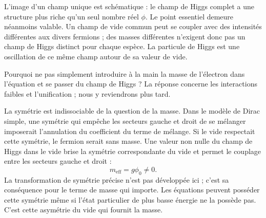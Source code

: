 \begin{classroomqa}
\end{classroomqa}

L’image d’un champ unique est schématique : le champ de Higgs complet a une structure plus riche qu’un seul nombre réel \(\phi\). Le point essentiel demeure néanmoins valable. Un champ de vide commun peut se coupler avec des intensités différentes aux divers fermions ; des masses différentes n’exigent donc pas un champ de Higgs distinct pour chaque espèce. La particule de Higgs est une oscillation de ce même champ autour de sa valeur de vide.

Pourquoi ne pas simplement introduire à la main la masse de l’électron dans l’équation et se passer du champ de Higgs ? La réponse concerne les interactions faibles et l’unification ; nous y reviendrons plus tard.

\begin{classroomqa}
\end{classroomqa}

\begin{classroomqa}
\end{classroomqa}

La symétrie est indissociable de la question de la masse. Dans le modèle de Dirac simple, une symétrie qui empêche les secteurs gauche et droit de se mélanger imposerait l’annulation du coefficient du terme de mélange. Si le vide respectait cette symétrie, le fermion serait sans masse. Une valeur non nulle du champ de Higgs dans le vide brise la symétrie correspondante du vide et permet le couplage entre les secteurs gauche et droit :
\begin{equation}
m_{\mathrm{eff}}=g\phi_0\neq0.
\end{equation}
La transformation de symétrie précise n’est pas développée ici ; c’est sa conséquence pour le terme de masse qui importe. Les équations peuvent posséder cette symétrie même si l’état particulier de plus basse énergie ne la possède pas. C’est cette asymétrie du vide qui fournit la masse.

